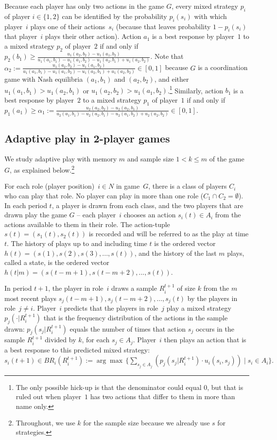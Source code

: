 Because each player has only two actions in the game $G$, every mixed strategy $p_i$ of player $i\in \{1,2\}$ can be identified by the probability $p_i(s_i)$ with which player~$i$ plays one of their actions~$s_i$ (because that leaves probability $1-p_i(s_i)$ that player~$i$ plays their other action). 
%
Action $a_1$ is a best response by player~$1$ to a mixed strategy $p_2$ of player~$2$ if and only if 
$p_2(b_1) \geq \frac{u_1(a_2,b_2)-u_1(a_1,b_2)}{u_1(a_1,b_1)-u_1(a_1,b_2)-u_1(a_2,b_1)+u_1(a_2,b_2)}.$ Note that $\alpha_2 :=\frac{u_1(a_2,b_2)-u_1(a_1,b_2)}{u_1(a_1,b_1)-u_1(a_1,b_2)-u_1(a_2,b_1)+u_1(a_2,b_2)}\in [0,1]$ because $G$ is a coordination game with Nash equilibria $(a_1,b_1)$ and $(a_2,b_2)$, and either $u_1(a_1,b_1) > u_1(a_2,b_1)$ or $u_1(a_2,b_2) > u_1(a_1,b_2)$.\footnote{The only possible hick-up is that the denominator could equal 0, but that is ruled out when player~$1$ has two actions that differ to them in more than name only.}
%
Similarly, action $b_1$ is a best response by player~$2$ to a mixed strategy $p_1$ of player~$1$ if and only if 
$p_1(a_1) \geq \alpha_1 := \frac{u_2(a_2,b_2)-u_2(a_2,b_1)}{u_2(a_1,b_1)-u_2(a_2,b_1)-u_2(a_1,b_2)+u_2(a_2,b_2)} \in [0,1]$.


\subsection{Adaptive play in 2-player games}
 
We study adaptive play \citep{young1993evolution} with memory $m$ and sample size $1<k\leq m$ of the game~$G$, as explained below.\footnote{Throughout, we use $k$ for the sample size because we already use $s$ for strategies.} 

For each role (player position)~$i\in N$ in game~$G$, there is a class of players $C_i$ who can play that role. No player can play in more than one role ($C_1\cap C_2=\emptyset$). 
In each period $t$, a player is drawn from each class, and the two players that are drawn play the game $G$ -- each player~$i$ chooses an action $s_i(t)\in A_i$ from the actions available to them in their role. 
The action-tuple $s(t) = (s_1(t), s_2(t))$ is recorded and will be referred to as the play at time $t$. 
The history of plays up to and including time $t$ is the ordered vector $h(t) = (s(1), s(2), s(3), ..., s(t))$, and the history of the last $m$ plays, called a state, is the ordered vector $h(t|m) = (s(t-m+1), s(t-m+2), ..., s(t))$.

In period $t+1$, the player in role~$i$ draws a sample $R_i^{t+1}$ of size $k$ from the $m$ most recent plays $s_j(t-m+1), s_j(t-m+2), \ldots, s_j(t)$ by the players in role~$j\neq i$. 
Player~$i$ predicts that the players in role~$j$ play a mixed strategy $p_j(\cdot | R_i^{t+1})$ that is the frequency distribution of the actions in the sample drawn: $p_j(s_j | R_i^{t+1})$ equals the number of times that action $s_j$ occurs in the sample $R_i^{t+1}$ divided by $k$, for each $s_j\in A_j$. 
%
Player~$i$ then plays an action that is a best response to this predicted mixed strategy:  
$s_i(t+1)\in BR_i(R_i^{t+1}):=\arg\max \,\{ \sum_{s_j\in A_j} \left( p_j(s_j | R_i^{t+1})\cdot u_i(s_i,s_j) \right) \mid s_i\in A_i \} .$



